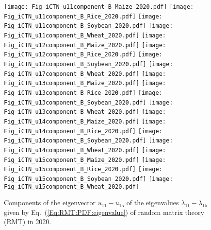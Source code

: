 \documentclass[preprint,3p,times,sort&compress]{elsarticle}
\begin{document}
 \begin{figure}[h!]
      \centering
      \texttt{[image: Fig\_iCTN\_u11component\_B\_Maize\_2020.pdf]}
      \texttt{[image: Fig\_iCTN\_u11component\_B\_Rice\_2020.pdf]}
      \texttt{[image: Fig\_iCTN\_u11component\_B\_Soybean\_2020.pdf]}
      \texttt{[image: Fig\_iCTN\_u11component\_B\_Wheat\_2020.pdf]}
      \texttt{[image: Fig\_iCTN\_u12component\_B\_Maize\_2020.pdf]}
      \texttt{[image: Fig\_iCTN\_u12component\_B\_Rice\_2020.pdf]}
      \texttt{[image: Fig\_iCTN\_u12component\_B\_Soybean\_2020.pdf]}
      \texttt{[image: Fig\_iCTN\_u17component\_B\_Wheat\_2020.pdf]}
      \texttt{[image: Fig\_iCTN\_u13component\_B\_Maize\_2020.pdf]}
      \texttt{[image: Fig\_iCTN\_u13component\_B\_Rice\_2020.pdf]}
      \texttt{[image: Fig\_iCTN\_u13component\_B\_Soybean\_2020.pdf]}
      \texttt{[image: Fig\_iCTN\_u13component\_B\_Wheat\_2020.pdf]}
      \texttt{[image: Fig\_iCTN\_u14component\_B\_Maize\_2020.pdf]}
      \texttt{[image: Fig\_iCTN\_u14component\_B\_Rice\_2020.pdf]}
      \texttt{[image: Fig\_iCTN\_u14component\_B\_Soybean\_2020.pdf]}
      \texttt{[image: Fig\_iCTN\_u14component\_B\_Wheat\_2020.pdf]}
      \texttt{[image: Fig\_iCTN\_u15component\_B\_Maize\_2020.pdf]}
      \texttt{[image: Fig\_iCTN\_u15component\_B\_Rice\_2020.pdf]}
      \texttt{[image: Fig\_iCTN\_u15component\_B\_Soybean\_2020.pdf]}
      \texttt{[image: Fig\_iCTN\_u15component\_B\_Wheat\_2020.pdf]}
      \caption{Components of the eigenvector $u_{11}-u_{15}$ of the eigenvalues $\lambda_{11}-\lambda_{15}$ given by Eq.~(\ref{Eq:RMT:PDF:eigenvalue}) of random matrix theory (RMT) in 2020.}
      \label{Fig:iCTN:PDF:eigenvalue:11-15:2020}
\end{figure}
\end{document}
